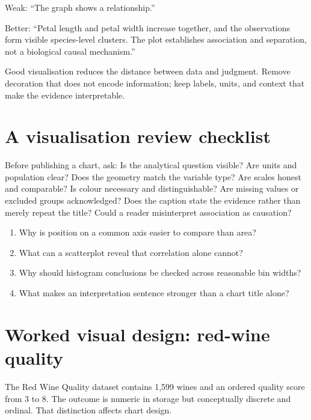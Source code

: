 \begin{workedexample}
Weak: ``The graph shows a relationship.''

Better: ``Petal length and petal width increase together, and the observations form visible species-level clusters. The plot establishes association and separation, not a biological causal mechanism.''
\end{workedexample}

\begin{keyidea}
Good visualisation reduces the distance between data and judgment. Remove decoration that does not encode information; keep labels, units, and context that make the evidence interpretable.
\end{keyidea}


\section{A visualisation review checklist}
Before publishing a chart, ask: Is the analytical question visible? Are units and population clear? Does the geometry match the variable type? Are scales honest and comparable? Is colour necessary and distinguishable? Are missing values or excluded groups acknowledged? Does the caption state the evidence rather than merely repeat the title? Could a reader misinterpret association as causation?


\begin{quickcheck}
\begin{enumerate}
  \item Why is position on a common axis easier to compare than area?
  \item What can a scatterplot reveal that correlation alone cannot?
  \item Why should histogram conclusions be checked across reasonable bin widths?
  \item What makes an interpretation sentence stronger than a chart title alone?
\end{enumerate}
\end{quickcheck}

\section{Worked visual design: red-wine quality}

The Red Wine Quality dataset contains 1,599 wines and an ordered quality score from 3 to 8. The outcome is numeric in storage but conceptually discrete and ordinal. That distinction affects chart design.


